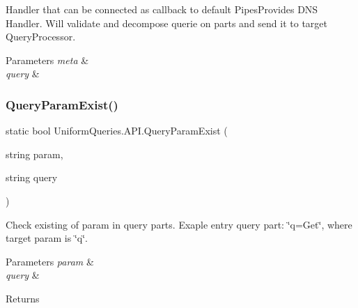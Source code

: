 Handler that can be connected as callback to default Pipes\+Provides D\+NS Handler. Will validate and decompose querie on parts and send it to target Query\+Processor. 


\begin{DoxyParams}{Parameters}
{\em meta} & \\
\hline
{\em query} & \\
\hline
\end{DoxyParams}
\mbox{\label{class_uniform_queries_1_1_a_p_i_a1a0ad73e1dad7f7ec61398cb33ec18a4}} 
\subsubsection{\texorpdfstring{Query\+Param\+Exist()}{QueryParamExist()}\hspace{0.1cm}{\footnotesize\ttfamily [1/2]}}
{\footnotesize\ttfamily static bool Uniform\+Queries.\+A\+P\+I.\+Query\+Param\+Exist (\begin{DoxyParamCaption}\item[{string}]{param,  }\item[{string}]{query }\end{DoxyParamCaption})\hspace{0.3cm}{\ttfamily [static]}}



Check existing of param in query parts. Exaple entry query part\+: \char`\"{}q=\+Get\char`\"{}, where target param is \char`\"{}q\char`\"{}. 


\begin{DoxyParams}{Parameters}
{\em param} & \\
\hline
{\em query} & \\
\hline
\end{DoxyParams}
\begin{DoxyReturn}{Returns}

\end{DoxyReturn}
\mbox{\label{class_uniform_queries_1_1_a_p_i_a0f6c53ca64000015c8bf7bed30d9c57a}} 

